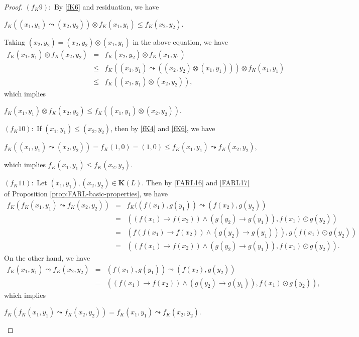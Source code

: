 \documentclass[final,12pt,times]{elsarticle}
\theoremstyle{plain}
\theoremstyle{definition}
\theoremstyle{break}
\begin{document}
\begin{proof}
$(f_K9)$:\  By \ref{fK6} and residuation, we have
\begin{center} $f_K((x_1,y_1)\leadsto (x_2,y_2))\otimes f_K(x_1,y_1)\leq f_K(x_2,y_2)$.
\end{center}
Taking $(x_2,y_2)=(x_2,y_2)\otimes (x_1,y_1)$ in the above equation, we have
\begin{eqnarray*} f_K(x_1,y_1)\otimes f_K(x_2,y_2)&=&f_K(x_2,y_2)\otimes f_K(x_1,y_1)\\&\leq&  f_K((x_1,y_1)\leadsto ((x_2,y_2)\otimes (x_1,y_1)))\otimes f_K(x_1,y_1)\\&\leq& f_K((x_1,y_1)\otimes (x_2,y_2)),
\end{eqnarray*} which implies
\begin{center} $f_K(x_1,y_1)\otimes f_K(x_2,y_2)\leq f_K((x_1,y_1)\otimes (x_2,y_2))$.
\end{center}

$(f_K10)$:\ If $(x_1,y_1)\leq (x_2,y_2)$, then by \ref{fK4} and \ref{fK6}, we have
\begin{center}$f_K((x_1,y_1)\leadsto (x_2,y_2))=f_K(1,0)=(1,0)\leq f_K(x_1,y_1)\leadsto f_K(x_2,y_2)$,
\end{center} which implies $f_K(x_1,y_1)\leq f_K(x_2,y_2)$.

$(f_K11)$:\ Let $(x_1,y_1),(x_2,y_2)\in \mathbf{K}(L)$. Then by \eqref{FARL16} and \eqref{FARL17} of Proposition \ref{prop:FARL-basic-properties}, we have
\begin{eqnarray*}
                f_K( f_K(x_1,y_1)\leadsto f_K(x_2,y_2))&=&  f_K((f(x_1),g(y_1))\leadsto (f(x_2),g (y_2))\\ &=& ((f(x_1)\rightarrow f(x_2))\wedge(g(y_2)\rightarrow g(y_1)),f(x_1)\odot g(y_2))\\ &=& (f(f(x_1)\rightarrow f (x_2))\wedge(g(y_2)\rightarrow g(y_1))),g (f(x_1)\odot g(y_2))\\ &=& ((f(x_1) \rightarrow f(x_2))\wedge (g (y_2)\rightarrow g(y_1)),f(x_1)\odot g(y_2)).
               \end{eqnarray*}
On the other hand, we have
\begin{eqnarray*}
                f_K(x_1,y_1)\leadsto  f_K(x_2,y_2)&=& (f(x_1),g(y_1))\leadsto (f(x_2),g(y_2))\\ &=& ((f(x_1) \rightarrow f (x_2))\wedge (g(y_2)\rightarrow g(y_1)),f(x_1)\odot g(y_2)),
               \end{eqnarray*} which implies 
\begin{center} $f_K( f_K(x_1,y_1)\leadsto f_K(x_2,y_2))=f_K(x_1,y_1)\leadsto  f_K(x_2,y_2)$.
\end{center}


\end{proof}
\end{document}
